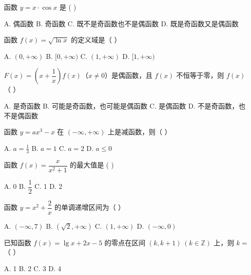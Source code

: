 \documentclass[11pt, a4paper]{article}
\begin{document}
\begin{baitap}[7]
函数 $y = x \cdot \cos x$ 是 ( )
\par\vspace{3pt}
\noindent A. 偶函数 \quad B. 奇函数 \quad C. 既不是奇函数也不是偶函数 \quad D. 既是奇函数又是偶函数
\end{baitap}

\begin{baitap}[8]
函数 $f(x) = \sqrt{\ln x}$ 的定义域是（ ）
\par\vspace{3pt}
\noindent A. $(0, +\infty)$ \quad B. $[0, +\infty)$ \quad C. $(1, +\infty)$ \quad D. $[1, +\infty)$
\end{baitap}

\begin{baitap}[9]
$F(x) = \left(x + \dfrac{1}{x}\right) f(x)$（$x \neq 0$）是偶函数，且 $f(x)$ 不恒等于零，则 $f(x)$（ ）
\par\vspace{3pt}
\noindent A. 是奇函数 \quad B. 可能是奇函数，也可能是偶函数 \quad C. 是偶函数 \quad D. 不是奇函数，也不是偶函数
\end{baitap}

\begin{baitap}[10]
函数 $y=ax^3-x$ 在 $(-\infty,+\infty)$ 上是减函数，则（ ）
\par\vspace{3pt}
\noindent A. $a=\frac{1}{3}$ \quad B. $a=1$ \quad C. $a=2$ \quad D. $a\le0$
\end{baitap}

\begin{baitap}[11]
函数 $f(x) = \dfrac{x}{x^2+1}$ 的最大值是 ( )
\par\vspace{3pt}
\noindent A. 0 \quad B. $\dfrac{1}{2}$ \quad C. 1 \quad D. 2
\end{baitap}

\begin{baitap}[12]
函数 $y = x^2 + \dfrac{2}{x}$ 的单调递增区间为（ ）
\par\vspace{3pt}
\noindent A. $(-\infty, 7)$ \quad B. $(\sqrt{2}, +\infty)$ \quad C. $(1, +\infty)$ \quad D. $(-\infty, 0)$
\end{baitap}

\begin{baitap}[13]
已知函数 $f(x)=\lg x+2x-5$ 的零点在区间 $(k,k+1)\ (k\in\mathbb{Z})$ 上，则 $k=$（ ）
\par\vspace{3pt}
\noindent A. 1 \quad B. 2 \quad C. 3 \quad D. 4
\end{baitap}
\end{document}
